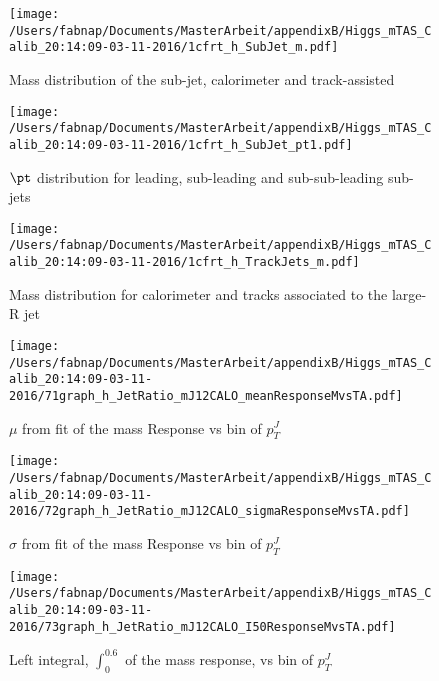 \begin{figure}
 
\texttt{[image: /Users/fabnap/Documents/MasterArbeit/appendixB/Higgs\_mTAS\_Calib\_20:14:09-03-11-2016/1cfrt\_h\_SubJet\_m.pdf]}
\caption{Mass distribution of the sub-jet, calorimeter and track-assisted}
 
\end{figure}
% 
\begin{figure}
 
\texttt{[image: /Users/fabnap/Documents/MasterArbeit/appendixB/Higgs\_mTAS\_Calib\_20:14:09-03-11-2016/1cfrt\_h\_SubJet\_pt1.pdf]}
\caption{$\pt$ distribution for leading, sub-leading and sub-sub-leading sub-jets}
 
\end{figure}
\begin{figure}
 
\texttt{[image: /Users/fabnap/Documents/MasterArbeit/appendixB/Higgs\_mTAS\_Calib\_20:14:09-03-11-2016/1cfrt\_h\_TrackJets\_m.pdf]}
\caption{Mass distribution for calorimeter and tracks associated to the large-R jet}
 
\end{figure}

%

\begin{figure}

\texttt{[image: /Users/fabnap/Documents/MasterArbeit/appendixB/Higgs\_mTAS\_Calib\_20:14:09-03-11-2016/71graph\_h\_JetRatio\_mJ12CALO\_meanResponseMvsTA.pdf]}
\caption{$\mu $ from fit of the mass Response vs bin of  $p_{T}^{J}$}

\end{figure}
\begin{figure}

\texttt{[image: /Users/fabnap/Documents/MasterArbeit/appendixB/Higgs\_mTAS\_Calib\_20:14:09-03-11-2016/72graph\_h\_JetRatio\_mJ12CALO\_sigmaResponseMvsTA.pdf]}
\caption{$\sigma $ from fit of the mass Response vs bin of $p_{T}^{J}$}

\end{figure}

\begin{figure}

\texttt{[image: /Users/fabnap/Documents/MasterArbeit/appendixB/Higgs\_mTAS\_Calib\_20:14:09-03-11-2016/73graph\_h\_JetRatio\_mJ12CALO\_I50ResponseMvsTA.pdf]}
\caption{Left integral, $\int_{0}^{0.6} $ of the mass response, vs bin of  $p_{T}^{J}$}

\end{figure}

